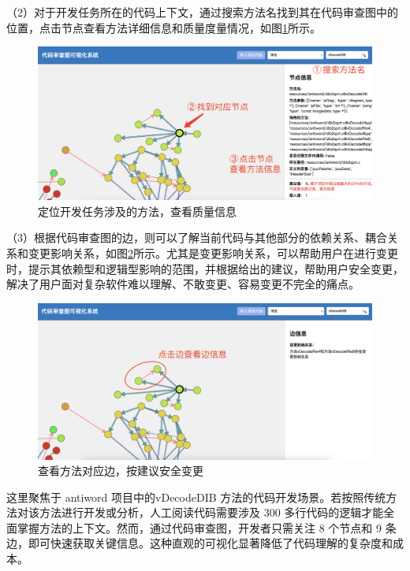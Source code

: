 \noindent（2）对于开发任务所在的代码上下文，通过搜索方法名找到其在代码审查图中的位置，点击节点查看方法详细信息和质量度量情况，如图\ref{1_定位开发任务涉及的方法，查看质量信息}所示。

\begin{figure}[h]
\centering
\includegraphics[width = 1.0\textwidth]{figures/开发2.jpg}
\caption{定位开发任务涉及的方法，查看质量信息}
\label{1_定位开发任务涉及的方法，查看质量信息}
\end{figure}

\noindent（3）根据代码审查图的边，则可以了解当前代码与其他部分的依赖关系、耦合关系和变更影响关系，如图\ref{1_查看方法对应边，按建议安全变更}所示。尤其是变更影响关系，可以帮助用户在进行变更时，提示其依赖型和逻辑型影响的范围，并根据给出的建议，帮助用户安全变更，解决了用户面对复杂软件难以理解、不敢变更、容易变更不完全的痛点。


\begin{figure}[h]
\centering
\includegraphics[width = 1.0\textwidth]{figures/开发3.jpg}
\caption{查看方法对应边，按建议安全变更}
\label{1_查看方法对应边，按建议安全变更}
\end{figure}

这里聚焦于 antiword 项目中的vDecodeDIB 方法的代码开发场景。若按照传统方法对该方法进行开发或分析，人工阅读代码需要涉及 300 多行代码的逻辑才能全面掌握方法的上下文。然而，通过代码审查图，开发者只需关注 8 个节点和 9 条边，即可快速获取关键信息。这种直观的可视化显著降低了代码理解的复杂度和成本。

